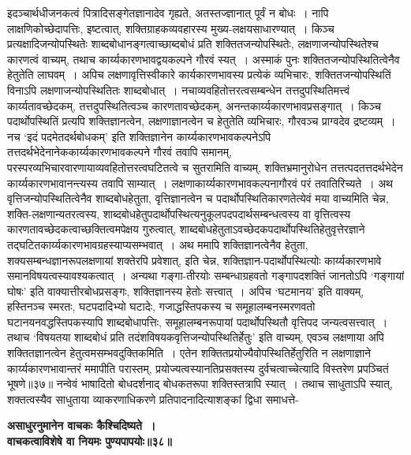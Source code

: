 {{{{ इदञ्चार्थधीजनकत्वं पित्रादिसङ्गेतज्ञानादेव गृह्यते, अतस्तज्ज्ञानात् पूर्वं न बोधः~।
नापि लाक्षणिकोच्छेदापत्तिः, इष्टत्वात्, शक्तिग्राहकव्यवहारस्य मुख्य-लक्षयसाधारण्यात्~।
 किञ्च प्रत्यक्षादिजन्योपस्थितेः शाब्दबोधानङ्गत्वाच्छाब्दबोधं प्रति शक्तितजन्योपस्थितेः, लक्षणाजन्योपस्थितेश्च कारणत्वं वाच्यम्, तथाच कार्य्यकारणभावद्वयकल्पने गौरवं स्यत्~।
अस्माकं पुनः शक्तितजन्योपस्थितित्वेनैव हेतुतेति लाघवम्~।
 अपिच लक्षणावृत्तिस्वीकारे कार्यकारणभावस्य प्रत्येकं व्यभिचारः, शक्तितजन्योपस्थितिं विनाऽपि लक्षणाजन्योपस्थितितः शाब्दबोधात्~।
नचाव्यवहितोत्तरत्वसम्बन्धेन तत्तदुपस्थितिमत्त्वं कार्य्यतावच्छेदकम्, तत्तदुपस्थितित्वञ्च कारणतावच्छेदकम्, अनन्तकार्य्यकारणभावप्रसङ्गात्~।
किञ्च पदार्थोपस्थितिं प्रत्यपि शक्तिज्ञानत्वेन, लक्षणाज्ञानत्वेन च हेतुतेति व्यभिचारः, गौरवञ्च प्राग्वदेव द्रष्टव्यम्~।
नच `इदं पदमेतदर्थबोधकम्' इति शक्तिज्ञानेन कार्य्यकारणभावकल्पनेऽपि तत्तदर्थभेदेनानेककार्य्यकारणभावकल्पने गौरवं तवापि समानम्, परस्परव्यभिचारवारणायाव्यवहितोत्तरत्वघटितत्वे च सुतरामिति वाच्यम्, शक्तिभ्रमानुरोधेन तत्तत्पदतत्तदर्थभेदेन कार्य्यकारणभावानन्त्यस्य तवापि साम्यात्~।
लक्षणाकार्य्यकारणभावकल्पनागौरवं परं तवातिरिच्यते~।
अथ वृत्तिजन्योपस्थितित्वेनैव शाब्दबोधहेतुता, वृत्तिज्ञानत्वेन च पदार्थोपस्थितिकारणतेत्येवं मया वाच्यमिति चेन्न, शक्ति-लक्षणान्यतरत्वस्य, शाब्दबोधहेतुपदार्थोपस्थित्यनुकूलपदपदार्थसम्बन्धत्वस्य वा वृत्तित्वस्य कारणतावच्छेदकत्वाच्छक्तित्वमपेक्षय गुरुत्वात्, शाब्दबोधहेतुताऽवच्छेदकपदार्थोपस्थितिहेतुवृत्तेरज्ञाने तद्घटितकार्य्यकारणभावग्रहस्याप्यसम्भवात्~।
 अथ ममापि शक्तिज्ञानत्वेनैव हेतुता, शक्यसम्बन्धज्ञानरूपलक्षणायां शक्तेरपि प्रवेशात्, इति चेन्न, शक्तिज्ञान-पदार्थोपस्थित्योः कार्य्यकारणभावे समानविषयत्वस्यावश्यकत्वात्~।
अन्यथा गङ्गा-तीरयोः सम्बन्धाग्रहवतो गङ्गापदशक्तिं जानतोऽपि `गङ्गायां घोषः' इति वाक्यात्तीरबोधप्रसङ्गः, शक्तिज्ञानस्य हेतोः सत्त्वात्~।
अपिच `घटमानय' इति वाक्यम्, हस्तिनञ्च स्मरतः, घटपदादिभ्यो घटादेः, गजाद्धस्तिपकस्य च समूहालम्बनस्मरणवतो घटानयनवद्धस्तिपकस्यापि शाब्दबोधापत्तिः, समूहालम्बनरूपायां पदार्थोपस्थितौ वृत्ति{पद} जन्यत्वसत्त्वात्~।
 तथाच `विषयतया शाब्दबोधं प्रति तदंशविषयकवृत्तिजन्योपस्थितिर्हेतुः' इति वाच्यम्, एवञ्च लक्षणाया अपि शक्तितज्ञानत्वेन हेतुत्वमसम्भवदुक्तिकमिति~।
 एतेन शक्तितप्रयोज्यैवोपस्थितिर्हेतुरिति न लक्षणाज्ञाने कार्य्यकारणभावान्तरं ममापीति परास्तम्, प्रयोज्यत्वस्यानतिप्रसक्तस्य दुर्वचत्वाच्चेत्यादि विस्तरेण प्रपञ्चितं भूषणे॥३७॥
 नन्वेवं भाषादितो बोधदर्शनाद् बोधकतरूपा शक्तिस्तत्रापि स्यात्~।
तथाच साधुताऽपि स्यात्, शक्तत्वस्यैव साधुताया व्याकरणाधिकरणे प्रतिपादनादित्याशङ्कां द्विधा समाधत्ते-
\begin{center}{\bfseries असाधुरनुमानेन वाचकः कैश्चिदिष्यते~।\\
 वाचकत्वाविशेषे वा नियमः पुण्यपापयोः॥३८॥}\end{center}
}}}}
